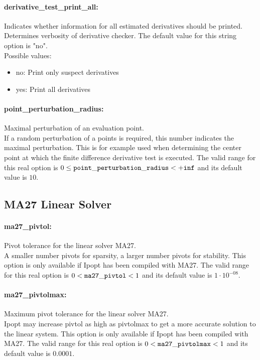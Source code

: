 \paragraph{derivative\_test\_print\_all:}\label{sec:derivative_test_print_all} Indicates whether information for all estimated derivatives should be printed. $\;$ \\
 Determines verbosity of derivative checker.
The default value for this string option is "no".
\\ 
Possible values:
\begin{itemize}
   \item no: Print only suspect derivatives
   \item yes: Print all derivatives
\end{itemize}

\paragraph{point\_perturbation\_radius:}\label{sec:point_perturbation_radius} Maximal perturbation of an evaluation point. $\;$ \\
 If a random perturbation of a points is required,
this number indicates the maximal perturbation. 
This is for example used when determining the
center point at which the finite difference
derivative test is executed. The valid range for this real option is 
$0 \le {\tt point\_perturbation\_radius } <  {\tt +inf}$
and its default value is $10$.


\subsection{MA27 Linear Solver}

\paragraph{ma27\_pivtol:}\label{sec:ma27_pivtol} Pivot tolerance for the linear solver MA27. $\;$ \\
 A smaller number pivots for sparsity, a larger
number pivots for stability.  This option is only
available if Ipopt has been compiled with MA27. The valid range for this real option is 
$0 <  {\tt ma27\_pivtol } <  1$
and its default value is $1 \cdot 10^{-08}$.


\paragraph{ma27\_pivtolmax:}\label{sec:ma27_pivtolmax} Maximum pivot tolerance for the linear solver MA27. $\;$ \\
 Ipopt may increase pivtol as high as pivtolmax to
get a more accurate solution to the linear
system.  This option is only available if Ipopt
has been compiled with MA27. The valid range for this real option is 
$0 <  {\tt ma27\_pivtolmax } <  1$
and its default value is $0.0001$.


